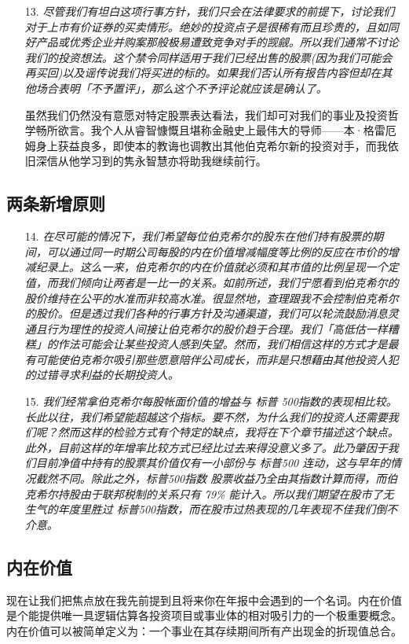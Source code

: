 \documentclass[UTF8,a4paper,zihao=-4,fontset = windows]{ctexart} %
\begin{document}
\begin{itemize}
    \item [13.]
    \textit{尽管我们有坦白这项行事方针，我们只会在法律要求的前提下，讨论我们对于上市有价证券的买卖情形。绝妙的投资点子是很稀有而且珍贵的，且如同好产品或优秀企业并购案那般极易遭致竞争对手的觊觎。所以我们通常不讨论我们的投资想法。这个禁令同样适用于我们已经出售的股票(因为我们可能会再买回)以及谣传说我们将买进的标的。如果我们否认所有报告内容但却在其他场合表明「不予置评」，那么这个不予评论就应该是确认了。}
    
    虽然我们仍然没有意愿对特定股票表达看法，我们却可对我们的事业及投资哲学畅所欲言。我个人从睿智慷慨且堪称金融史上最伟大的导师——本·格雷厄姆身上获益良多，即使本的教诲也调教出其他伯克希尔新的投资对手，而我依旧深信从他学习到的隽永智慧亦将助我继续前行。
\end{itemize}
\subsection{两条新增原则}
\begin{itemize}
    \item [14.]
    \textit{在尽可能的情况下，我们希望每位伯克希尔的股东在他们持有股票的期间，可以通过同一时期公司每股的内在价值增减幅度等比例的反应在市价的增减纪录上。这么一来，伯克希尔的内在价值就必须和其市值的比例呈现一个定值，而我们倾向让两者是一比一的关系。如前所述，我们宁愿看到伯克希尔的股价维持在公平的水准而非较高水准。很显然地，查理跟我不会控制伯克希尔的股价。但是透过我们各种的行事方针及沟通渠道，我们可以轮流鼓励消息灵通且行为理性的投资人间接让伯克希尔的股价趋于合理。我们「高低估一样糟糕」的作法可能会让某些投资人感到失望。然而，我们相信这样的方式才是最有可能使伯克希尔吸引那些愿意陪伴公司成长，而非是只想藉由其他投资人犯的过错寻求利益的长期投资人。 }
    \item [15.]
    \textit{我们经常拿伯克希尔每股帐面价值的增益与 标普 500指数的表现相比较。长此以往，我们希望能超越这个指标。要不然，为什么我们的投资人还需要我们呢？然而这样的检验方式有个特定的缺点，我将在下个章节描述这个缺点。此外，目前这样的年增率比较方式已经比过去来得没意义多了。此乃肇因于我们目前净值中持有的股票其价值仅有一小部份与 标普500 连动，这与早年的情况截然不同。除此之外，标普500指数 股票收益乃全由其指数计算而得，而伯克希尔持股由于联邦税制的关系只有 79\% 能计入。所以我们期望在股市了无生气的年度里胜过 标普500指数，而在股市过热表现的几年表现不佳我们倒不介意。}
\end{itemize}

\subsection{内在价值}
现在让我们把焦点放在我先前提到且将来你在年报中会遇到的一个名词。内在价值是个能提供唯一具逻辑估算各投资项目或事业体的相对吸引力的一个极重要概念。内在价值可以被简单定义为：一个事业在其存续期间所有产出现金的折现值总合。
\end{document}
